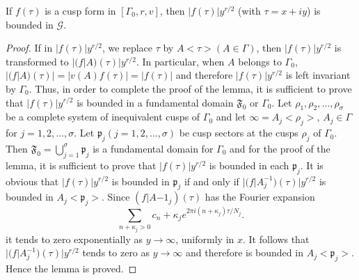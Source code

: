 \begin{lem}\label{chap3:lem5}
If $f(\tau)$ is a cusp form in $[\Gamma_0, r, v]$, then
$|f(\tau)|y^{r/2}$ (with $\tau=x+iy$) is bounded in $\mathscr{G}$.
\end{lem}

\begin{proof}
If in $|f(\tau)|y^{r/2}$, we replace $\tau$ by $A<\tau>(A\in
\Gamma)$, then $|f(\tau)|y^{r/2}$ is transformed to
$|(f|A)(\tau)|y^{r/2}$. In particular, when $A$ belongs to $\Gamma_0$,
$|(f|A)(\tau)|=|v(A)f(\tau)|=|f(\tau)|$ and therefore
$|f(\tau)|y^{r/2}$ is left invariant by $\Gamma_0$. Thus, in order to
complete the proof of the lemma, it is sufficient to prove that
$|f(\tau)|y^{r/2}$ is bounded in a fundamental domain $\mathfrak{F}_0$
or $\Gamma_0$. Let $\rho_1, \rho_2, \ldots, \rho_{\sigma}$ be a
complete system of inequivalent cusps of $\Gamma_0$ and let
$\infty=A_j<\rho_j>$, $A_j\in \Gamma$  for $j=1,2,\ldots,
\sigma$. Let $\mathfrak{p}_j(j=1,2,\ldots,\sigma)$ be cusp sectors at
the cusps $\rho_j$ of $\Gamma_0$. Then $\mathfrak{F}_0 =
\bigcup\limits^{\sigma}_{j=1}\mathfrak{p}_j$ is a fundamental domain for
$\Gamma_0$ and for the proof of the lemma, it is sufficient to prove
that $|f(\tau)|y^{r/2}$ is bounded in each $\mathfrak{p}_j$. It is
obvious that $|f(\tau)|y^{r/2}$ is bounded in $\mathfrak{p}_j$ if and
only if $|(f|A^{-1}_j)(\tau)|y^{r/2}$ is bounded in
$A_j<\mathfrak{p}_j>$. Since $(f|A{-1}_j)(\tau)$ has the Fourier
expansion 
$$
\sum_{n+\kappa_j>0} c_n+\kappa_j e^{2\pi i(n+\kappa_j)\tau/ N_j}.
$$
it tends to zero exponentially as $y\to \infty$, uniformly in $x$. It
follows that $|(f|A^{-1}_j)(\tau)|y^{r/2}$ tends to zero as $y\to
\infty$ and therefore is bounded in $A_j<\mathfrak{p}_j>$. Hence the
lemma is proved. 
\end{proof}

